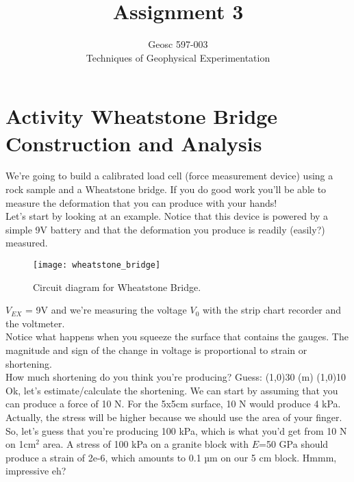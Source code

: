 \documentclass[10pt]{article}
\begin{document}

\title{Assignment 3}%
\author{Geosc 597-003\\
Techniques of Geophysical Experimentation} %

\maketitle




\section*{Activity Wheatstone Bridge Construction and Analysis}

We’re going to build a calibrated load cell (force measurement device) using a rock sample and a Wheatstone bridge.  If you do good work you’ll be able to measure the deformation that you can produce with your hands!  \\

Let’s start by looking at an example.  Notice that this device is powered by a simple 9V battery and that the deformation you produce is readily (easily?) measured. \\


\begin{figure}[ht]
	\centering
	\texttt{[image: wheatstone\_bridge]}
	\caption{Circuit diagram for Wheatstone Bridge.}
	\label{fig:wheatstone}
\end{figure}
 
$ V_{EX} $ = 9V and we’re measuring the voltage $ V_0 $ with the strip chart recorder and the voltmeter.\\

Notice what happens when you squeeze the surface that contains the gauges. The magnitude and sign of the change in voltage is proportional to strain or shortening.  \\

How much shortening do you think you’re producing? Guess: \line(1,0){30} (m) \line(1,0){10} \\

Ok, let’s estimate/calculate the shortening.  We can start by assuming that you can produce a force of 10 N.  For the 5x5cm surface, 10 N would produce 4 kPa. Actually, the stress will be higher because we should use the area of your finger. So, let’s guess that you’re producing 100 kPa, which is what you’d get from 10 N on 1cm$ ^2 $ area.  A stress of 100 kPa on a granite block with $ E $=50 GPa should produce a strain of 2e-6, which amounts to 0.1 µm on our 5 cm block. Hmmm, impressive eh? \\
\end{document}
